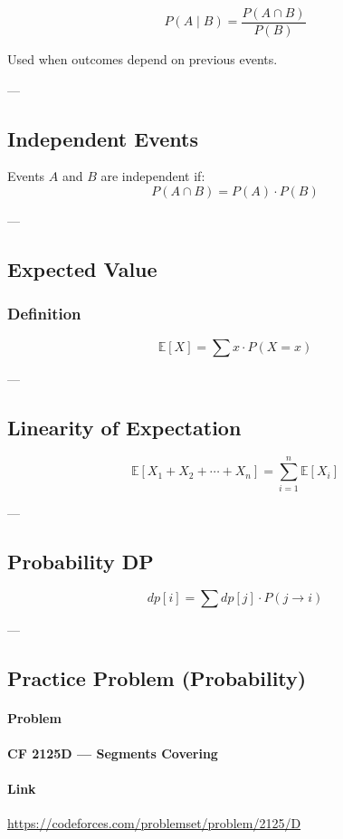 \documentclass[11pt]{article}
\begin{document}
\[
P(A \mid B) = \frac{P(A \cap B)}{P(B)}
\]

Used when outcomes depend on previous events.

---

\subsection{Independent Events}

Events $A$ and $B$ are independent if:
\[
P(A \cap B) = P(A) \cdot P(B)
\]

---

\subsection{Expected Value}

\subsubsection{Definition}
\[
\mathbb{E}[X] = \sum x \cdot P(X = x)
\]

---

\subsection{Linearity of Expectation}

\[
\mathbb{E}[X_1 + X_2 + \cdots + X_n]
=
\sum_{i=1}^{n} \mathbb{E}[X_i]
\]

---

\subsection{Probability DP}

\[
dp[i] = \sum dp[j] \cdot P(j \rightarrow i)
\]

---

\subsection{Practice Problem (Probability)}

\paragraph{Problem}
\textbf{CF 2125D — Segments Covering}

\paragraph{Link}
\url{https://codeforces.com/problemset/problem/2125/D}
\end{document}
